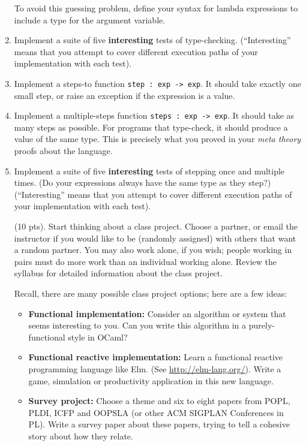 \documentclass[11pt]{article}
\newcounter{taskcounter}
\newcounter{taskPercentCounter}
\newcommand{\task}[1]
  {\bigskip \noindent {\bf Task\addtocounter{taskPercentCounter}{#1} \arabic{taskcounter}\addtocounter{taskcounter}{1}} (#1 pts).}
\begin{document}
\begin{enumerate}
  To avoid this guessing problem, define your syntax for lambda
  expressions to include a type for the argument variable.

\item Implement a suite of five \textbf{interesting} tests of type-checking.  
(``Interesting'' means that you attempt to cover different execution paths of your implementation with each test).
%

\item Implement a steps-to function \texttt{step : exp -> exp}. It
  should take exactly one small step, or raise an exception if the
  expression is a value.

\item Implement a multiple-steps function \texttt{steps : exp ->
  exp}. It should take as many steps as possible.  For programs that
  type-check, it should produce a value of the same type.  This is
  precisely what you proved in your \emph{meta theory} proofs about
  the language.

\item Implement a suite of five \textbf{interesting} tests of stepping once and multiple times.  
  (Do your expressions always have the same type as they step?)
(``Interesting'' means that you attempt to cover different execution paths of your implementation with each test).
%

\task{10} Start thinking about a class project.  Choose a partner, or
email the instructor if you would like to be (randomly assigned) with
others that want a random partner.  You may also work alone, if you
wish; people working in pairs must do more work than an individual
working alone.  Review the syllabus for detailed information about the
class project.

Recall, there are many possible class project options; here are a few ideas:

\begin{itemize}
\item \textbf{Functional implementation:}
  Consider an algorithm or system that seems interesting to you.
  Can you write this algorithm in a purely-functional style in OCaml?
\item \textbf{Functional reactive implementation:} Learn a functional
  reactive programming language like Elm. (See
  \url{http://elm-lang.org/}). Write a game, simulation or
  productivity application in this new language.
\item \textbf{Survey project:} Choose a theme and six to eight papers
  from POPL, PLDI, ICFP and OOPSLA (or other ACM SIGPLAN Conferences
  in PL).  Write a survey paper about these papers, trying to tell a
  cohesive story about how they relate.
\end{itemize}


\end{enumerate}
\end{document}
